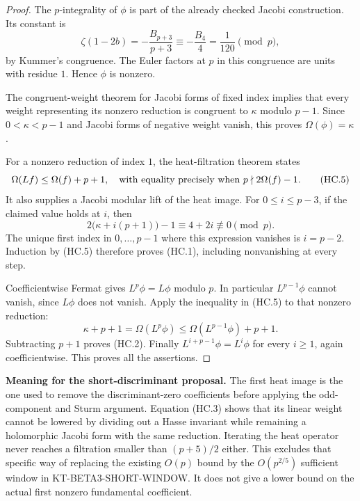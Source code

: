 \documentclass[11pt,a4paper]{article}
\theoremstyle{definition}
\renewcommand{\paragraph}[1]{\par\smallskip\noindent\textbf{#1}\quad\ignorespaces}
\begin{document}
\begin{proof}
The $p$-integrality of $\phi$ is part of the already checked
Jacobi construction.  Its constant is
\[
 \zeta(1-2b)=-\frac{B_{p+3}}{p+3}
             \equiv-\frac{B_4}{4}=\frac1{120}\pmod p,
 \tag{HC.4}
\]
by Kummer's congruence.  The Euler factors at $p$ in this
congruence are units with residue $1$.  Hence $\phi$ is nonzero.

The congruent-weight theorem for Jacobi forms of fixed index
implies that every weight representing its nonzero reduction
is congruent to $\kappa$ modulo $p-1$.  Since
$0<\kappa<p-1$ and Jacobi forms of negative weight vanish,
this proves $\Omega(\phi)=\kappa$.

For a nonzero reduction of index $1$, the heat-filtration
theorem states
\[
 \Omega(Lf)\leq\Omega(f)+p+1,
 \quad\hbox{with equality precisely when }
 p\nmid 2\Omega(f)-1.
 \tag{HC.5}
\]
It also supplies a Jacobi modular lift of the heat image.
For $0\leq i\leq p-3$, if the claimed value holds at $i$, then
\[
 2\bigl(\kappa+i(p+1)\bigr)-1
       \equiv4+2i\not\equiv0\pmod p.
 \tag{HC.6}
\]
The unique first index in $0,\ldots,p-1$ where this expression
vanishes is $i=p-2$.  Induction by (HC.5) therefore proves
(HC.1), including nonvanishing at every step.

Coefficientwise Fermat gives $L^p\phi=L\phi$ modulo $p$.
In particular $L^{p-1}\phi$ cannot vanish, since $L\phi$
does not vanish.  Apply the inequality in (HC.5) to that
nonzero reduction:
\[
 \kappa+p+1=\Omega(L^p\phi)
       \leq\Omega(L^{p-1}\phi)+p+1.
 \]
Subtracting $p+1$ proves (HC.2).
Finally $L^{i+p-1}\phi=L^i\phi$ for every $i\geq1$, again
coefficientwise.  This proves all the assertions.
\end{proof}

\paragraph{Meaning for the short-discriminant proposal.}
The first heat image is the one used to remove the
discriminant-zero coefficients before applying the odd-component
and Sturm argument.  Equation (HC.3) shows that its linear
weight cannot be lowered by dividing out a Hasse invariant
while remaining a holomorphic Jacobi form with the same
reduction.  Iterating the heat operator never reaches a
filtration smaller than $(p+5)/2$ either.  This excludes that
specific way of replacing the existing $O(p)$ bound by the
$O(p^{2/5})$ sufficient window in KT-BETA3-SHORT-WINDOW.
It does not give a lower bound on the actual first nonzero
fundamental coefficient.
\end{document}
